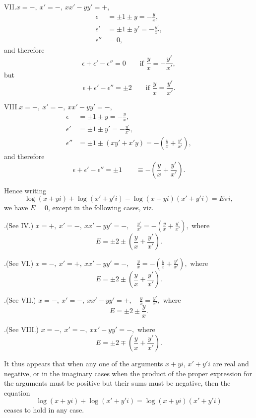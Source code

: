 \documentclass[11pt,a4paper]{book}
\begin{document}
\noindent VII.\quad $x = -,\ x' = -,\ xx' - yy' = +,$
\begin{align*}
\epsilon &= \pm 1 \pm y = -\frac{y}{x},\\
\epsilon' &= \pm 1 \pm y' = -\frac{y'}{x'},\\
\epsilon'' &= 0,
\end{align*}
and therefore
\[
\epsilon + \epsilon' - \epsilon'' = 0\qquad\text{if } \frac{y}{x} = -\frac{y'}{x'},
\]
but
\[
\epsilon + \epsilon' - \epsilon'' = \pm 2 \qquad\text{if } \frac{y}{x} = \frac{y'}{x'}.
\]

\noindent VIII.\quad $x = -,\ x' = -,\ xx' - yy' = -,$
\begin{align*}
\epsilon &= \pm 1 \pm y = -\frac{y}{x},\\
\epsilon' &= \pm 1 \pm y' = -\frac{y'}{x'},\\
\epsilon'' &= \pm 1 \pm (xy' + x'y) = -\left(\frac{y}{x} + \frac{y'}{x'}\right),
\end{align*}
and therefore
\[
\epsilon + \epsilon' - \epsilon'' = \pm 1 \qquad \equiv -\left(\frac{y}{x} + \frac{y'}{x'}\right).
\]

\medskip

Hence writing
\[
\log(x+yi) + \log(x'+y'i) - \log(x+yi)(x'+y'i) = E\pi i,
\]
we have $E = 0$, except in the following cases, viz.

\medskip

.\quad (See IV.) \quad $x = +,\ x' = -,\ xx' - yy' = -, \quad \frac{y'}{x'} = -\left(\frac{y}{x} + \frac{y'}{x'}\right),$
\quad where
\[
E = \pm 2 \pm \left(\frac{y}{x} + \frac{y'}{x'}\right).
\]

.\quad (See VI.) \quad $x = -,\ x' = +,\ xx' - yy' = -, \quad \frac{y}{x} = -\left(\frac{y}{x} + \frac{y'}{x'}\right),$
\quad where
\[
E = \pm 2 \pm \left(\frac{y}{x} + \frac{y'}{x'}\right).
\]

.\quad (See VII.) \quad $x = -,\ x' = -,\ xx' - yy' = +, \quad \frac{y}{x} = \frac{y'}{x'},$
\quad where
\[
E = \pm 2 \pm \frac{y}{x}.
\]

.\quad (See VIII.) \quad $x = -,\ x' = -,\ xx' - yy' = -,$
\quad where
\[
E = \pm 2 \mp \left(\frac{y}{x} + \frac{y'}{x'}\right).
\]

\medskip

It thus appears that when any one of the arguments $x+yi$, $x'+y'i$ are real and negative, or
in the imaginary cases when the product of the proper expression for the
arguments must be positive but their sums must be negative, then the equation
\[
\log(x+yi) + \log(x'+y'i) = \log(x+yi)(x'+y'i)
\]
ceases to hold in any case.
\end{document}
